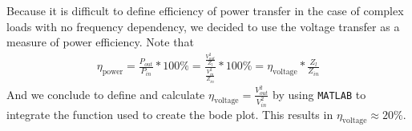 \documentclass[11pt,titlepage]{report}
\begin{document}
Because it is difficult to define efficiency of power transfer in the case of complex loads with no frequency dependency, we decided to use the voltage transfer as a measure of power efficiency. Note that
\begin{align}
\eta_{\text{power}}=\frac{P_{out}}{P_{in}}*100\% = \frac{\frac{V_{out}^2}{Z_l}}{\frac{V_{in}^2}{Z_{in}}}*100\%=\eta_{\text{voltage}}*\frac{Z_l}{Z_{in}}
\end{align}
And we conclude to define and calculate $\eta_{\text{voltage}}=\frac{V_{out}^2}{V_{in}^2}$ by using \texttt{MATLAB} to integrate the function used to create the bode plot. This results in $\eta_{\text{voltage}}\approx 20\%$.
\end{document}
